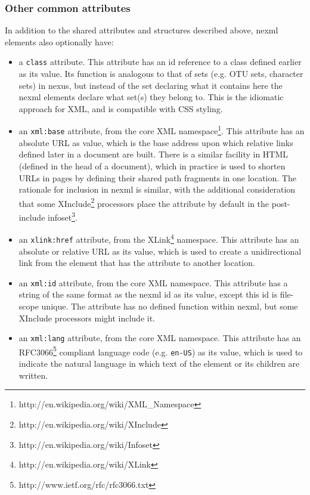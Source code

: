 \documentclass{article}
\newcommand{\code}{\texttt}
\begin{document}
\subsubsection{Other common attributes}
In addition to the shared attributes and structures described above, nexml elements also optionally have:

\begin{itemize}

\item a \code{class} attribute. This attribute has an id reference to a class
defined earlier as its value. Its function is analogous to that of sets (e.g. OTU sets, character sets) in nexus, but instead of the set 
declaring what it contains here the nexml elements declare what set(s) they belong to. This is the idiomatic 
approach for XML, and is compatible with CSS styling.

\item an \code{xml:base} attribute, from the core XML
namespace\footnote{http://en.wikipedia.org/wiki/XML\_Namespace}. 
This attribute has an absolute URL as value, which is the base address upon which relative links defined later 
in a document are built. There is a similar facility in HTML (defined in the head of a document), which in 
practice is used to shorten URLs in pages by defining their shared path fragments in one location. The rationale 
for inclusion in nexml is similar, with the additional consideration that some 
XInclude\footnote{http://en.wikipedia.org/wiki/XInclude} processors place the
attribute by default in the post-include
infoset\footnote{http://en.wikipedia.org/wiki/Infoset}. 

\item an \code{xlink:href} attribute, from the
XLink\footnote{http://en.wikipedia.org/wiki/XLink} namespace. This attribute has an absolute or relative URL as 
its value, which is used to create a unidirectional link from the 
element that has the attribute to another location.

\item an \code{xml:id} attribute, from the core XML namespace. This attribute
has a string of the same format as the nexml id as its value, except this id is file-scope unique. The attribute has no defined function within 
nexml, but some XInclude processors might include it.

\item an \code{xml:lang} attribute, from the core XML namespace. This
attribute has an RFC3066\footnote{http://www.ietf.org/rfc/rfc3066.txt} compliant language code
(e.g. \code{en-US}) as its value, which is used to indicate the natural
language in which text of the element or its children are written.

\end{itemize}
\end{document}

